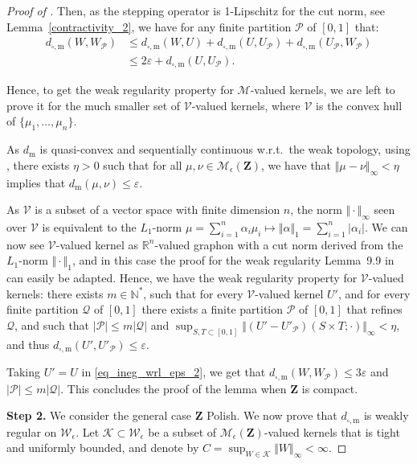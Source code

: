 \documentclass{amsart}
\newcommand{\wrt}{w.r.t.\ }
\theoremstyle{plain}
\theoremstyle{definition}
\newcommand{\Space}{\mathbf{Z}}
\newcommand{\ck}{\mathcal{K}}
\newcommand{\cp}{\mathcal{P}}
\newcommand{\cM}{\mathcal{M}}
\newcommand{\cP}{\mathcal{P}}
\newcommand{\cQ}{\mathcal{Q}}
\newcommand{\MeasEps}{\mathcal{M}_{\epsilon}(\Space)}
\newcommand{\KernelEps}{\mathcal{W}_{\epsilon}}
\newcommand{\TM}[1]{\norm{#1}_\infty}
\newcommand{\m}{\mathrm{m}}
\newcommand{\dmeas}{d_\m}
\newcommand{\dcut}{d_{\square,\m}}
\newcommand{\N}{\mathbb{N}}
\newcommand{\R}{\mathbb{R}}
\newcommand{\norm}[1]{\Vert#1\Vert}
\newcommand{\eps}{\varepsilon}
\begin{document}
\begin{proof}[Proof of ]
Then, as  the stepping operator is  1-Lipschitz  for the  cut norm, see
Lemma~\ref{contractivity_2}, we  have for  any finite partition  $\mathcal{P}$ of
$[0,1]$ that:
  \begin{align}
    \dcut(W , W_\mathcal{P})
    & \leq \dcut(W , U) + \dcut(U , U_\mathcal{P}) + \dcut(U_\mathcal{P}
      , W_\mathcal{P}) \nonumber \\
    &\leq  2\eps + \dcut(U , U_\mathcal{P})  .
      \label{eq_ineg_wrl_eps_2}
\end{align}

Hence, to get the weak regularity property for $\cM$-valued kernels,
we are left to prove it for the much smaller set of 
$\mathcal{V}$-valued kernels, 
where $\mathcal{V}$ is the convex hull of $\{\mu_1, \ldots, \mu_n\}$.

\medskip

As $\dmeas$ is quasi-convex and sequentially continuous \wrt the weak topology,
using , there exists $\eta>0$ such that
for all $\mu,\nu\in \MeasEps$, we have that $\TM{\mu - \nu} < \eta$ 
implies that $\dmeas(\mu,\nu) \leq \eps$.

As $\mathcal{V}$  is a subset of a vector  space with  finite dimension $n$,  
the norm $\TM{\cdot}$  seen  over  $\mathcal{V}$  is  equivalent  to  the  $L_1$-norm
$\mu  =   \sum_{i=1}^n  \alpha_i   \mu_i  \mapsto   \norm{\alpha}_1  =
\sum_{i=1}^n \vert \alpha_i\vert$.  We can now see $\mathcal{V}$-valued
kernel  as $\R^n$-valued  graphon  with  a cut  norm  derived from  the
$L_1$-norm  $\norm{\cdot}_1$,   and  in  this  case
the proof for the weak regularity Lemma~9.9 in~\cite{Lovasz}
can easily be adapted. 
Hence,  we have  the weak  regularity property  for $\mathcal{V}$-valued
kernels:    
there   exists    $m\in\N^*$,   such    that   for    every
$\mathcal{V}$-valued   kernel   $U'$,   and for every finite partition $\cQ$ of $[0,1]$
 there   exists   a   finite partition
$\mathcal{P}$  of  $[0,1]$  that  refines $\mathcal{Q}$,
and such that $\vert\cP\vert \leq m \vert\cQ\vert$
and $\sup_{S,T\subset [0,1]}\TM{(U' - U'_{\mathcal{P}})(S\times T;\cdot)} < \eta$,
and thus $\dcut(U', U'_{\mathcal{P}}) \leq \eps$.

Taking    $U'=U$ in \eqref{eq_ineg_wrl_eps_2}, we get   that
$ \dcut(W  , W_\mathcal{P})\leq 3\varepsilon$  and $|\cp|\leq  m |\mathcal{Q}|$. This
concludes the proof of the lemma when $\Space$ is compact.
\medskip


\textbf{Step 2.} We consider the general case $\Space $  Polish. 
We  now prove  that  $\dcut$  is weakly  regular  on $\KernelEps$.   
  Let  $\ck  \subset \KernelEps$  be  a subset  of
  $\MeasEps$-valued  kernels that  is  tight and uniformly bounded,
  and denote by $C=\sup_{W\in\ck} \TM{W}<\infty$.
  

\end{proof}
\end{document}
